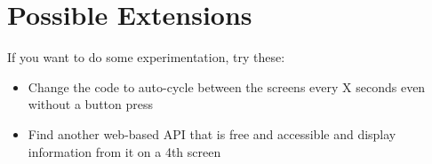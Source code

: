 \section{Possible Extensions}
If you want to do some experimentation, try these:

\begin{itemize}
    \item Change the code to auto-cycle between the screens every X seconds even without a button press
    \item Find another web-based API that is free and accessible and display information from it on a 4th screen
\end{itemize}

